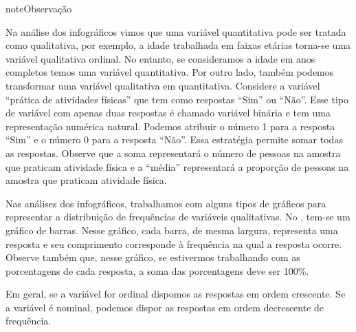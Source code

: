 \begin{sphinxadmonition}{note}{Observação}

Na análise dos infográficos vimos que uma variável quantitativa pode ser tratada como qualitativa, por exemplo, a idade trabalhada em faixas etárias torna-se uma variável qualitativa ordinal. No entanto, se consideramos a idade em anos completos temos uma variável quantitativa. Por outro lado, também podemos transformar uma variável qualitativa em quantitativa. Considere a variável ``prática de atividades físicas'' que tem como respostas ``Sim'' ou ``Não''. Esse tipo de variável com apenas duas respostas é chamado variável binária e tem uma representação numérica natural. Podemos atribuir o número 1 para a resposta ``Sim'' e o número 0 para a resposta ``Não''. Essa estratégia permite somar todas as respostas. Observe que a soma representará o número de pessoas na amostra que praticam atividade física e a ``média'' representará a proporção de pessoas na amostra que praticam atividade física.
\end{sphinxadmonition}


Nas análises dos infográficos, trabalhamos com alguns tipos de gráficos para representar a distribuição de frequências de variáveis qualitativas. No {\hyperref[\detokenize{PE103-0:fig-infografico-pnad-3}]{}}, tem-se um gráfico de barras. Nesse gráfico, cada barra, de mesma largura, representa uma resposta e seu comprimento corresponde à frequência na qual a resposta ocorre. Observe também que, nesse gráfico, se estivermos trabalhando com as porcentagens de cada resposta, a soma das porcentagens deve ser 100\%.

Em geral, se a variável for ordinal dispomos as respostas em ordem crescente. Se a variável é nominal, podemos dispor as respostas em ordem decrescente de frequência.

